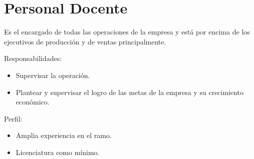\begin{Actor}{\hypertarget{Actor: Personal Docente}{\section{Personal Docente}}}{
	Es el encargado de todas las operaciones de la empresa y está por encima de los ejecutivos de producción y de ventas principalmente.
}
    \item[Responsabilidades:] \ISenter
    \begin{itemize}
		\item Supervisar la operación.
		\item Plantear y supervisar el logro de las metas de la empresa y su crecimiento económico.
    \end{itemize}

	\item[Perfil:] \ISenter
    \begin{itemize}
		\item Amplia experiencia en el ramo.
		\item Licenciatura como mínimo.
    \end{itemize}
\end{Actor}

